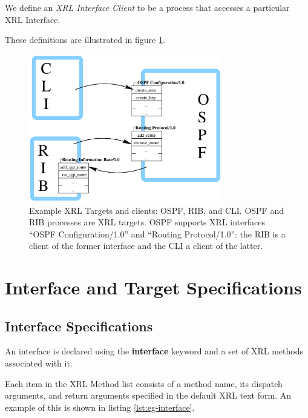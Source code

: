 \documentclass[11pt]{article}
\begin{document}
We define an \emph{XRL Interface Client} to be a process that accesses
a particular XRL Interface.

These definitions are illustrated in figure \ref{fig:eg-interfaces}.

\begin{figure}
  \begin{center}
    \includegraphics[width=0.75\textwidth]{figs/xrl_ifs}
  \end{center}
  \caption{Example XRL Targets and clients: OSPF, RIB, and CLI.
OSPF and RIB processes are XRL targets.  OSPF supports XRL interfaces
``OSPF Configuration/1.0'' and ``Routing Protocol/1.0'': the RIB is a
client of the former interface and the CLI a client of the latter.
}
  \label{fig:eg-interfaces}
\end{figure}

\section{Interface and Target Specifications}

\subsection{Interface Specifications}

An interface is declared using the \textbf{interface} keyword and a
set of XRL methods associated with it.
 
\smallskip
\noindent{}

\smallskip Each item in the XRL Method list consists of a method name, its
dispatch arguments, and return arguments specified in the default XRL
text form.  An example of this is shown in listing \ref{lst:eg-interface}.
\end{document}
